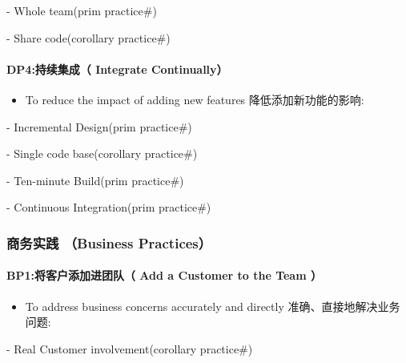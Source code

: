 \begin{description}
\tightlist
\item[]
- Whole team(prim practice\#)

- Share code(corollary practice\#)
\end{description}

\hypertarget{dp4ux6301ux7eedux96c6ux6210-integrate-continually}{%
\paragraph{DP4:持续集成（ Integrate
Continually）}\label{dp4ux6301ux7eedux96c6ux6210-integrate-continually}}

\begin{itemize}
\tightlist
\item
  To reduce the impact of adding new features 降低添加新功能的影响:
\end{itemize}

\begin{description}
\tightlist
\item[]
- Incremental Design(prim practice\#)

- Single code base(corollary practice\#)

- Ten-minute Build(prim practice\#)

- Continuous Integration(prim practice\#)
\end{description}

\hypertarget{ux5546ux52a1ux5b9eux8df5-business-practices}{%
\subsubsection{商务实践 （Business
Practices）}\label{ux5546ux52a1ux5b9eux8df5-business-practices}}

\hypertarget{bp1ux5c06ux5ba2ux6237ux6dfbux52a0ux8fdbux56e2ux961f-add-a-customer-to-the-team}{%
\paragraph{BP1:将客户添加进团队（ Add a Customer to the Team
）}\label{bp1ux5c06ux5ba2ux6237ux6dfbux52a0ux8fdbux56e2ux961f-add-a-customer-to-the-team}}

\begin{itemize}
\tightlist
\item
  To address business concerns accurately and directly
  准确、直接地解决业务问题:
\end{itemize}

\begin{description}
\tightlist
\item[]
- Real Customer involvement(corollary practice\#)
\end{description}

